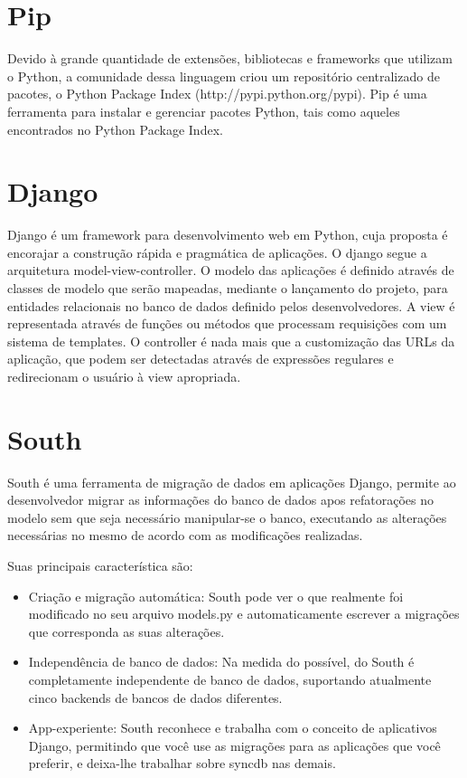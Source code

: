 \documentclass{abnt}
\begin{document}
	\section{Pip}
	
		Devido à grande quantidade de extensões, bibliotecas e frameworks que utilizam o Python, a comunidade dessa linguagem criou um repositório centralizado de pacotes, o Python Package Index (http://pypi.python.org/pypi).
		Pip é uma ferramenta para instalar e gerenciar pacotes Python, tais como aqueles encontrados no Python Package Index.\cite{PIPSITE}

	\section{Django}
		Django é um framework para desenvolvimento web em Python, cuja proposta
		é encorajar a construção rápida e pragmática de aplicações.\cite{DJANGOSITE}
		O django segue a arquitetura model-view-controller. O modelo das aplicações
		é definido através de classes de modelo que serão mapeadas, mediante o lançamento do projeto,
		para entidades relacionais no banco de dados definido pelos desenvolvedores. A view é
		representada através de funções ou métodos que processam requisições com um sistema
		de templates. O controller é nada mais que a customização das URLs da aplicação,
		que podem ser detectadas através de expressões regulares e redirecionam o
		usuário à view apropriada.\cite{DJANGOWIKIPEDIA}
	
	\section{South}
		South é uma ferramenta de migração de dados em aplicações Django, 
		permite ao desenvolvedor migrar as informações do banco de dados apos refatorações no modelo
		sem que seja necessário manipular-se o banco, executando as alterações necessárias 
		no mesmo de acordo com as modificações realizadas.
				
		Suas principais característica são: 
			\begin{itemize}
			\item Criação e migração automática: South pode ver o que realmente foi modificado no seu arquivo models.py
			 e automaticamente escrever a migrações que corresponda as suas alterações.
			\item Independência de banco de dados: Na medida do possível, do South é completamente independente 
			de banco de dados, suportando atualmente cinco backends de bancos de dados diferentes.
			\item App-experiente: South reconhece e trabalha com o conceito de aplicativos Django, permitindo que você use 
			as migrações para as aplicações que você preferir, e deixa-lhe trabalhar sobre syncdb nas demais.
			\end{itemize}
	
\end{document}
